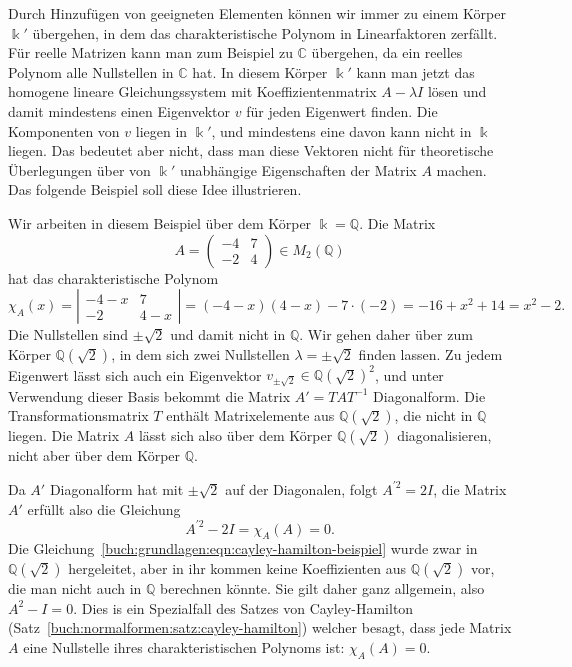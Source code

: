 Durch Hinzufügen von geeigneten Elementen können wir immer zu einem 
Körper $\Bbbk'$ übergehen, in dem das charakteristische Polynom
in Linearfaktoren zerfällt.
%
Für reelle Matrizen kann man zum Beispiel zu $\mathbb{C}$ übergehen,
da ein reelles Polynom alle Nullstellen in $\mathbb{C}$ hat.
In diesem Körper $\Bbbk'$ kann man jetzt das homogene lineare Gleichungssystem
mit Koeffizientenmatrix $A-\lambda I$ lösen und damit mindestens 
einen Eigenvektor $v$ für jeden Eigenwert finden.
Die Komponenten von $v$ liegen in $\Bbbk'$, und mindestens eine davon kann
nicht in $\Bbbk$ liegen.
Das bedeutet aber nicht, dass man diese Vektoren nicht für theoretische
Überlegungen über von $\Bbbk'$ unabhängige Eigenschaften der Matrix $A$ machen.
Das folgende Beispiel soll diese Idee illustrieren.

\begin{beispiel}
Wir arbeiten in diesem Beispiel über dem Körper $\Bbbk=\mathbb{Q}$.
Die Matrix
\[
A=\begin{pmatrix}
-4&7\\
-2&4
\end{pmatrix}
\in
M_2(\mathbb{Q})
\]
hat das charakteristische Polynom
\[
\chi_A(x)
=
\left|
\begin{matrix}
-4-x&7\\-2&4-x
\end{matrix}
\right|
=
(-4-x)(4-x)-7\cdot(-2)
=
-16+x^2+14
=
x^2-2.
\]
Die Nullstellen sind $\pm\sqrt{2}$ und damit nicht in $\mathbb{Q}$.
Wir gehen daher über zum Körper $\mathbb{Q}(\!\sqrt{2})$, in dem
sich zwei Nullstellen $\lambda=\pm\sqrt{2}$ finden lassen.
Zu jedem Eigenwert lässt sich auch ein Eigenvektor
$v_{\pm\sqrt{2}}\in \mathbb{Q}(\!\sqrt{2})^2$, und unter Verwendung dieser
Basis bekommt die Matrix $A'=TAT^{-1}$ Diagonalform.
Die Transformationsmatrix $T$ enthält Matrixelemente aus
$\mathbb{Q}(\!\sqrt{2})$, die nicht in $\mathbb{Q}$ liegen.
Die Matrix $A$ lässt sich also über dem Körper $\mathbb{Q}(\!\sqrt{2})$
diagonalisieren, nicht aber über dem Körper $\mathbb{Q}$.

Da $A'$ Diagonalform hat mit $\pm\sqrt{2}$ auf der Diagonalen, folgt
$A^{\prime 2} = 2I$, die Matrix $A'$ erfüllt also die Gleichung
\begin{equation}
A^{\prime 2}-2I= \chi_{A}(A) = 0.
\label{buch:grundlagen:eqn:cayley-hamilton-beispiel}
\end{equation}
Die Gleichung~\ref{buch:grundlagen:eqn:cayley-hamilton-beispiel}
wurde zwar in $\mathbb{Q}(\!\sqrt{2})$ hergeleitet, aber in ihr kommen
keine Koeffizienten aus $\mathbb{Q}(\!\sqrt{2})$ vor, die man nicht auch
in $\mathbb{Q}$ berechnen könnte.
Sie gilt daher ganz allgemein, also $A^2-I=0$.
Dies is ein Spezialfall des Satzes von Cayley-Hamilton
%
%
(Satz~\ref{buch:normalformen:satz:cayley-hamilton})
welcher besagt, dass jede Matrix $A$ eine Nullstelle ihres 
charakteristischen Polynoms ist: $\chi_A(A)=0$.
\end{beispiel}


